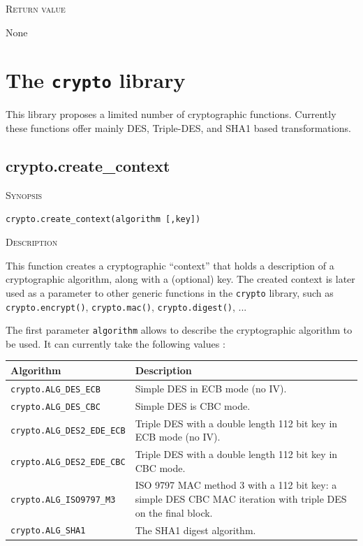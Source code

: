 \documentclass[11pt]{report}
\newcommand{\mansection}[1]{\vspace{0.5em}\par\noindent\textsc{#1}\vspace{0.5em}\par}
\newcommand{\syn}[1]{\texttt{#1}}
\begin{document}
\mansection{Return value}
  None

\section{The \syn{crypto} library}

This library proposes a limited number of cryptographic functions.
Currently these functions offer mainly DES, Triple-DES, and SHA1 based transformations.

\subsection{crypto.create\_context}

\mansection{Synopsis}
\syn{crypto.create\_context(algorithm [,key])}

\mansection{Description}
  This function creates a cryptographic ``context'' that holds a description of a 
  cryptographic algorithm, along with a (optional) key.
  The created context is later used as a parameter to other generic functions in the \syn{crypto}
  library, such as \syn{crypto.encrypt()}, \syn{crypto.mac()}, \syn{crypto.digest()}, ...

  The first parameter \syn{algorithm} allows to describe the cryptographic algorithm to be used.
  It can currently take the following values :

  \vspace{2em}
  \begin{tabular}{|l|p{8cm}|}
  \hline
  \textbf{Algorithm}                & \textbf{Description} \\
  \hline
  \hline
  \syn{crypto.ALG\_DES\_ECB}        & Simple DES in ECB mode (no IV). \\
  \hline
  \syn{crypto.ALG\_DES\_CBC}        & Simple DES is CBC mode. \\
  \hline
  \syn{crypto.ALG\_DES2\_EDE\_ECB}  & Triple DES with a double length 112 bit key in ECB mode (no IV). \\
  \hline
  \syn{crypto.ALG\_DES2\_EDE\_CBC}  & Triple DES with a double length 112 bit key in CBC mode.  \\
  \hline
  \syn{crypto.ALG\_ISO9797\_M3}     & ISO 9797 MAC method 3 with a 112 bit key: 
                                      a simple DES CBC MAC iteration with triple DES on the final block.\\
  \hline
  \syn{crypto.ALG\_SHA1}            & The SHA1 digest algorithm. \\
  \hline
  \end{tabular}
  \vspace{2em}
\end{document}
